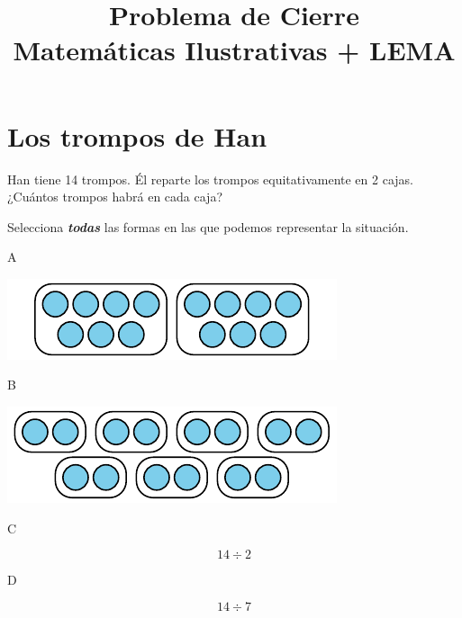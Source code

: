 \documentclass[,]{article}
\title{Problema de Cierre\\Matemáticas Ilustrativas + LEMA}
\date{}
\newcommand{\alert}[1]{\textbf{\textit{#1}}}
\begin{document}
\maketitle
\vspace{-1cm}
\section*{Los trompos de Han}
Han tiene 14 trompos. Él reparte los trompos equitativamente en 2 cajas. ¿Cuántos trompos habrá en cada caja?%
\par
Selecciona \alert{todas} las formas en las que podemos representar la situación.%
\begin{sidebyside}{4}{0.0075}{0.0075}{0.015}%
\begin{sbspanel}{0.02}%
A%
\end{sbspanel}%
\begin{sbspanel}{0.45}%
\includegraphics[max width=\linewidth,center]{../svg-source/tikz-file-151100.pdf}
\end{sbspanel}%
\begin{sbspanel}{0.02}%
B%
\end{sbspanel}%
\begin{sbspanel}{0.45}%
\includegraphics[max width=\linewidth,center]{../svg-source/tikz-file-151101.pdf}
\end{sbspanel}%
\end{sidebyside}%
\begin{sidebyside}{4}{0.0075}{0.0075}{0.015}%
\begin{sbspanel}{0.02}%
C%
\end{sbspanel}%
\begin{sbspanel}{0.45}%
\par
%
\begin{equation*}
14\div 2
\end{equation*}
%
\end{sbspanel}%
\begin{sbspanel}{0.02}%
\par
D%
\end{sbspanel}%
\begin{sbspanel}{0.45}%
\par
%
\begin{equation*}
14\div 7
\end{equation*}
%
\end{sbspanel}%
\end{sidebyside}%
\end{document}
